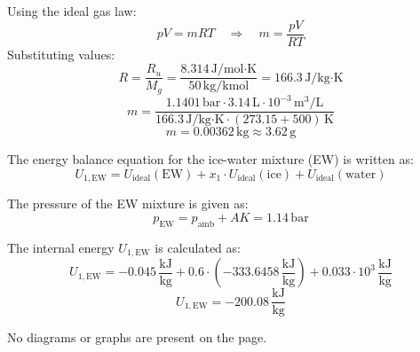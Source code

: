 Using the ideal gas law:  
\[
pV = mRT \quad \Rightarrow \quad m = \frac{pV}{RT}
\]  
Substituting values:  
\[
R = \frac{R_u}{M_g} = \frac{8.314 \, \text{J/mol·K}}{50 \, \text{kg/kmol}} = 166.3 \, \text{J/kg·K}
\]  
\[
m = \frac{1.1401 \, \text{bar} \cdot 3.14 \, \text{L} \cdot 10^{-3} \, \text{m}^3/\text{L}}{166.3 \, \text{J/kg·K} \cdot (273.15 + 500) \, \text{K}}
\]  
\[
m = 0.00362 \, \text{kg} \approx 3.62 \, \text{g}
\]

The energy balance equation for the ice-water mixture (EW) is written as:  
\[
U_{1,\text{EW}} = U_{\text{ideal}}(\text{EW}) + x_1 \cdot U_{\text{ideal}}(\text{ice}) + U_{\text{ideal}}(\text{water})
\]  

The pressure of the EW mixture is given as:  
\[
p_{\text{EW}} = p_{\text{amb}} + AK = 1.14 \, \text{bar}
\]  

The internal energy \( U_{1,\text{EW}} \) is calculated as:  
\[
U_{1,\text{EW}} = -0.045 \, \frac{\text{kJ}}{\text{kg}} + 0.6 \cdot (-333.6458 \, \frac{\text{kJ}}{\text{kg}}) + 0.033 \cdot 10^3 \, \frac{\text{kJ}}{\text{kg}}
\]  
\[
U_{1,\text{EW}} = -200.08 \, \frac{\text{kJ}}{\text{kg}}
\]  

No diagrams or graphs are present on the page.